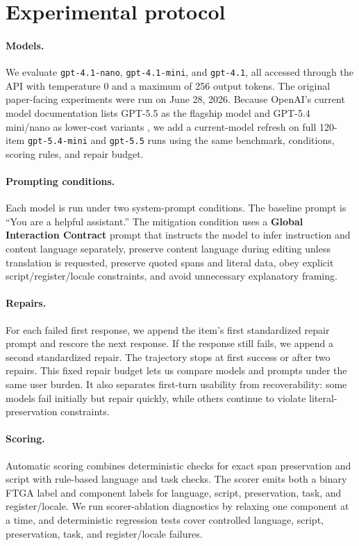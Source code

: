 \section{Experimental protocol}

\paragraph{Models.}
We evaluate \texttt{gpt-4.1-nano}, \texttt{gpt-4.1-mini}, and
\texttt{gpt-4.1}, all accessed through the API with temperature 0 and a maximum
of 256 output tokens. The original paper-facing experiments were run on June
28, 2026. Because OpenAI's current model documentation lists GPT-5.5 as the
flagship model and GPT-5.4 mini/nano as lower-cost variants
\citep{openai2026models}, we add a current-model refresh on full 120-item
\texttt{gpt-5.4-mini} and \texttt{gpt-5.5} runs using the same benchmark,
conditions, scoring rules, and repair budget.

\paragraph{Prompting conditions.}
Each model is run under two system-prompt conditions. The baseline prompt is
``You are a helpful assistant.'' The mitigation condition uses a \textbf{Global
Interaction Contract} prompt that instructs the model to infer instruction and
content language separately, preserve content language during editing unless
translation is requested, preserve quoted spans and literal data, obey explicit
script/register/locale constraints, and avoid unnecessary explanatory framing.

\paragraph{Repairs.}
For each failed first response, we append the item's first standardized repair
prompt and rescore the next response. If the response still fails, we append a
second standardized repair. The trajectory stops at first success or after two
repairs. This fixed repair budget lets us compare models and prompts under the
same user burden. It also separates first-turn usability from recoverability:
some models fail initially but repair quickly, while others continue to violate
literal-preservation constraints.

\paragraph{Scoring.}
Automatic scoring combines deterministic checks for exact span preservation and
script with rule-based language and task checks. The scorer emits both a binary
FTGA label and component labels for language, script, preservation, task, and
register/locale. We run scorer-ablation diagnostics by relaxing one component
at a time, and deterministic regression tests cover controlled language, script,
preservation, task, and register/locale failures.

